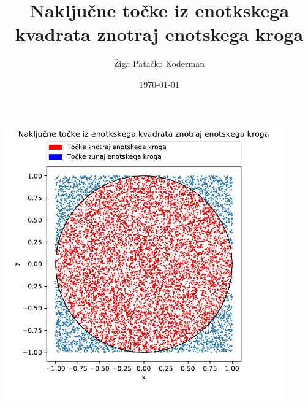 \documentclass[11pt,a4paper]{article}
\begin{document}
\title{Naklju\v cne to\v cke iz enotkskega kvadrata znotraj enotskega kroga}
\author{\v Ziga Pata\v cko Koderman}
\date{\today}

\maketitle

\begin{center}
\end{center}

\vspace{1cm}

\begin{center}
	\includegraphics[width=12cm]{scatter.pdf}
\end{center}
\end{document}
